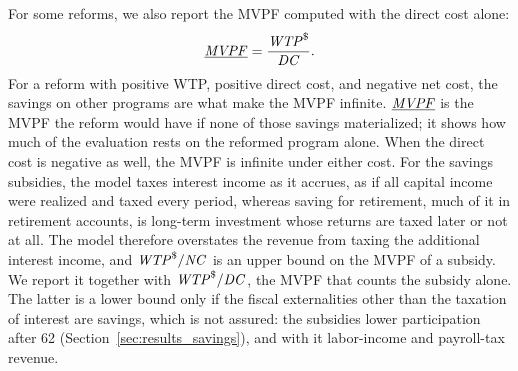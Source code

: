 For some reforms, we also report the MVPF computed with the direct cost alone:
\begin{equation}\label{eq:mvpf_lb}
\underline{\mathit{MVPF}}=\frac{\mathit{WTP}^{\$}}{\mathit{DC}}.
\end{equation}
For a reform with positive WTP, positive direct cost, and negative net cost, the savings on other programs are what make the MVPF infinite. $\underline{\mathit{MVPF}}$ is the MVPF the reform would have if none of those savings materialized; it shows how much of the evaluation rests on the reformed program alone. When the direct cost is negative as well, the MVPF is infinite under either cost. For the savings subsidies, the model taxes interest income as it accrues, as if all capital income were realized and taxed every period, whereas saving for retirement, much of it in retirement accounts, is long-term investment whose returns are taxed later or not at all. %
The model therefore overstates the revenue from taxing the additional interest income, and $\mathit{WTP}^{\$}/\mathit{NC}$ is an upper bound on the MVPF of a subsidy. We report it together with $\mathit{WTP}^{\$}/\mathit{DC}$, the MVPF that counts the subsidy alone. The latter is a lower bound only if the fiscal externalities other than the taxation of interest are savings, which is not assured: the subsidies lower participation after 62 (Section~\ref{sec:results_savings}), and with it labor-income and payroll-tax revenue.

